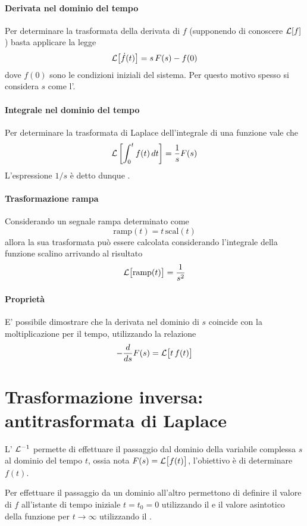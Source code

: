 \begin{multicols}{2}
		
		\paragraph{Derivata nel dominio del tempo} Per determinare la trasformata della derivata di $f$ (supponendo di conoscere $\mathcal L[f]$) basta applicare la legge
		\[ \mathcal L\big[\dot f(t)\big] = s\, F(s) - f(0) \]
		dove $f(0)$ sono le condizioni iniziali del sistema. Per questo motivo spesso si considera $s$ come l'.
		
		\paragraph{Integrale nel dominio del tempo} Per determinare la trasformata di Laplace dell'integrale di una funzione vale che
		\[ \mathcal L\left[\int_0^t f(t)\, dt\right] = \frac 1 s F(s) \]
		L'espressione $1/s$ è detto dunque . 
		
		\paragraph{Trasformazione rampa} Considerando un segnale rampa determinato come
		\[\textrm{ramp}(t) = t\, \textrm{scal}(t)\]
		allora la sua trasformata può essere calcolata considerando l'integrale della funzione scalino arrivando al risultato
		\[ \mathcal L\big[\textrm{ramp}(t)\big] = \frac{1}{s^2}\]
	\end{multicols}
	
	\paragraph{Proprietà} E' possibile dimostrare che la derivata nel dominio di $s$ coincide con la moltiplicazione per il tempo, utilizzando la relazione
	\[ - \frac{d}{ds} F(s) = \mathcal L\big[t\, f(t)\big]   \]
	
\section{Trasformazione inversa: antitrasformata di Laplace}
		L' $\mathcal L^{-1}$ permette di effettuare il passaggio dal dominio della variabile complessa $s$ al dominio del tempo $t$, ossia nota $F(s) = \mathcal L\big[f(t)\big]$, l'obiettivo è di determinare $f(t)$. 
		
		Per effettuare il passaggio da un dominio all'altro permettono di definire il valore di $f$ all'istante di tempo iniziale $t=t_0=0$ utilizzando il  e il valore asintotico della funzione per $t\rightarrow \infty$ utilizzando il .
		
